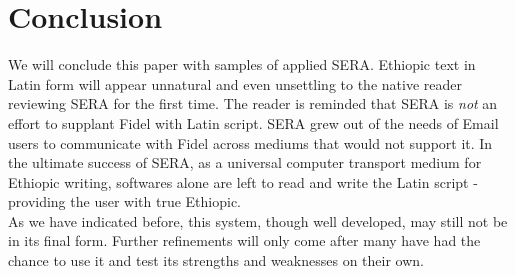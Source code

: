 
\section{Conclusion}
   
We will conclude this paper with samples of applied SERA.  Ethiopic text
in Latin form will appear unnatural and even unsettling to the native reader
reviewing SERA for the first time.  The reader is reminded that SERA is {\em not}
an effort to supplant Fidel with Latin script.  SERA grew out of the needs of 
Email users to communicate with Fidel across mediums that would not support it.
In the ultimate success of SERA, as a universal computer transport medium for 
Ethiopic writing, softwares alone are left to read and write the Latin script
 -providing the user with true Ethiopic. \\

As we have indicated before, this system, though well
developed, may still not be in its final form.  Further refinements
will only come after many have had the chance to use it and
test its strengths and weaknesses on their own. 
